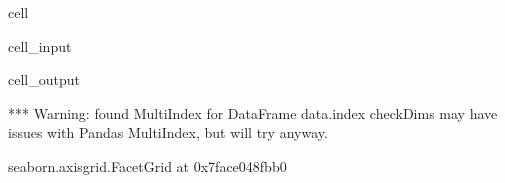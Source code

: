\documentclass[letterpaper,table,10pt,english]{jupyterBook}
\begin{document}
\begin{sphinxuseclass}{cell}\begin{sphinxVerbatimInput}

\begin{sphinxuseclass}{cell_input}
\begin{sphinxVerbatim}[commandchars=\\\{\}]
  
     
                 
                     
\end{sphinxVerbatim}

\end{sphinxuseclass}\end{sphinxVerbatimInput}
\begin{sphinxVerbatimOutput}

\begin{sphinxuseclass}{cell_output}
\begin{sphinxVerbatim}[commandchars=\\\{\}]
*** Warning: found MultiIndex for DataFrame data.index \PYGZhy{} checkDims may have issues with Pandas MultiIndex, but will try anyway.
\end{sphinxVerbatim}

\begin{sphinxVerbatim}[commandchars=\\\{\}]
\PYGZlt{}seaborn.axisgrid.FacetGrid at 0x7face048fbb0\PYGZgt{}
\end{sphinxVerbatim}

\noindent{}

\end{sphinxuseclass}\end{sphinxVerbatimOutput}

\end{sphinxuseclass}
\end{document}
